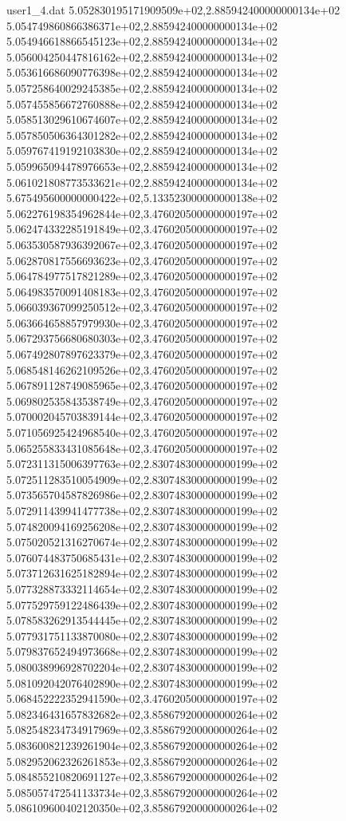 \begin{filecontents}{user1_4.dat}
5.052830195171909509e+02,2.885942400000000134e+02
5.054749860866386371e+02,2.885942400000000134e+02
5.054946618866545123e+02,2.885942400000000134e+02
5.056004250447816162e+02,2.885942400000000134e+02
5.053616686090776398e+02,2.885942400000000134e+02
5.057258640029245385e+02,2.885942400000000134e+02
5.057455856672760888e+02,2.885942400000000134e+02
5.058513029610674607e+02,2.885942400000000134e+02
5.057850506364301282e+02,2.885942400000000134e+02
5.059767419192103830e+02,2.885942400000000134e+02
5.059965094478976653e+02,2.885942400000000134e+02
5.061021808773533621e+02,2.885942400000000134e+02
5.675495600000000422e+02,5.133523000000000138e+02
5.062276198354962844e+02,3.476020500000000197e+02
5.062474332285191849e+02,3.476020500000000197e+02
5.063530587936392067e+02,3.476020500000000197e+02
5.062870817556693623e+02,3.476020500000000197e+02
5.064784977517821289e+02,3.476020500000000197e+02
5.064983570091408183e+02,3.476020500000000197e+02
5.066039367099250512e+02,3.476020500000000197e+02
5.063664658857979930e+02,3.476020500000000197e+02
5.067293756680680303e+02,3.476020500000000197e+02
5.067492807897623379e+02,3.476020500000000197e+02
5.068548146262109526e+02,3.476020500000000197e+02
5.067891128749085965e+02,3.476020500000000197e+02
5.069802535843538749e+02,3.476020500000000197e+02
5.070002045703839144e+02,3.476020500000000197e+02
5.071056925424968540e+02,3.476020500000000197e+02
5.065255833431085648e+02,3.476020500000000197e+02
5.072311315006397763e+02,2.830748300000000199e+02
5.072511283510054909e+02,2.830748300000000199e+02
5.073565704587826986e+02,2.830748300000000199e+02
5.072911439941477738e+02,2.830748300000000199e+02
5.074820094169256208e+02,2.830748300000000199e+02
5.075020521316270674e+02,2.830748300000000199e+02
5.076074483750685431e+02,2.830748300000000199e+02
5.073712631625182894e+02,2.830748300000000199e+02
5.077328873332114654e+02,2.830748300000000199e+02
5.077529759122486439e+02,2.830748300000000199e+02
5.078583262913544445e+02,2.830748300000000199e+02
5.077931751133870080e+02,2.830748300000000199e+02
5.079837652494973668e+02,2.830748300000000199e+02
5.080038996928702204e+02,2.830748300000000199e+02
5.081092042076402890e+02,2.830748300000000199e+02
5.068452222352941590e+02,3.476020500000000197e+02
5.082346431657832682e+02,3.858679200000000264e+02
5.082548234734917969e+02,3.858679200000000264e+02
5.083600821239261904e+02,3.858679200000000264e+02
5.082952062326261853e+02,3.858679200000000264e+02
5.084855210820691127e+02,3.858679200000000264e+02
5.085057472541133734e+02,3.858679200000000264e+02
5.086109600402120350e+02,3.858679200000000264e+02

\end{filecontents}
